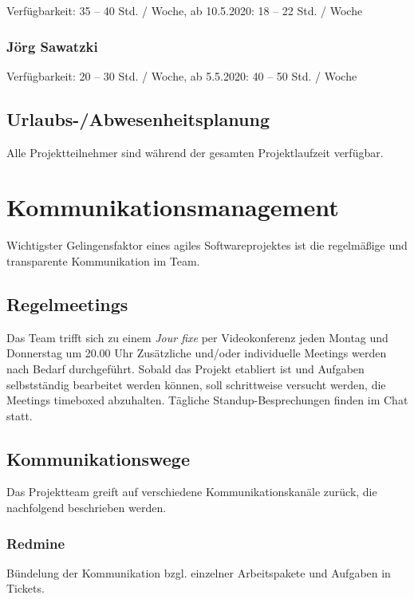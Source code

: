 \documentclass[a4paper,11pt,listof=numbered,glossary=totoc,parskip=half,toc=bib]{scrreprt}
\begin{document}
Verfügbarkeit: 35 -- 40 Std. / Woche, ab 10.5.2020: 18 -- 22 Std. / Woche

\subsection{Jörg Sawatzki}

Verfügbarkeit: 20 -- 30 Std. / Woche, ab 5.5.2020: 40 -- 50 Std. / Woche


\section{Urlaubs-/Abwesenheitsplanung}
Alle Projektteilnehmer sind während der gesamten Projektlaufzeit verfügbar.

\newpage
	\chapter{Kommunikationsmanagement}
	\label{sec:kommunikationsmanagement}
	
Wichtigster Gelingensfaktor eines agiles Softwareprojektes ist die regelmäßige und transparente Kommunikation im Team.

\section{Regelmeetings}

Das Team trifft sich zu einem \textit{Jour fixe} per Videokonferenz jeden Montag und Donnerstag um 20.00 Uhr
Zusätzliche und/oder individuelle Meetings werden nach Bedarf durchgeführt.
Sobald das Projekt etabliert ist und Aufgaben selbstständig bearbeitet werden können, soll schrittweise versucht werden, die Meetings timeboxed abzuhalten.
Tägliche Standup-Besprechungen finden im Chat statt. 

\section{Kommunikationswege}

Das Projektteam greift auf verschiedene Kommunikationskanäle zurück, die nachfolgend beschrieben werden.

\subsection{Redmine}

Bündelung der Kommunikation bzgl. einzelner Arbeitspakete und Aufgaben in Tickets.
\end{document}
